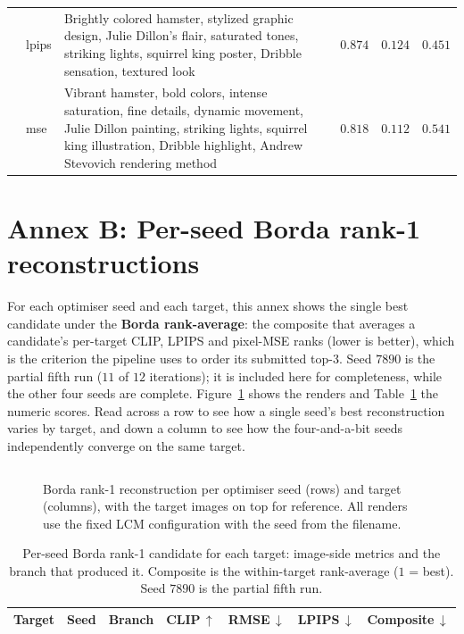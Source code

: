 \documentclass[runningheads]{llncs}
\begin{document}
\begin{table}[t]
\begin{tabular}{p{1.5cm} l p{5.6cm} c c c}
 & lpips & Brightly colored hamster, stylized graphic design, Julie Dillon's flair, saturated tones, striking lights, squirrel king poster, Dribble sensation, textured look & $0.874$ & $0.124$ & $0.451$ \\
 & mse & Vibrant hamster, bold colors, intense saturation, fine details, dynamic movement, Julie Dillon painting, striking lights, squirrel king illustration, Dribble highlight, Andrew Stevovich rendering method & $0.818$ & $0.112$ & $0.541$ \\
\bottomrule
\end{tabular}
\end{table}

\clearpage
\section*{Annex B: Per-seed Borda rank-1 reconstructions}
\label{annex:borda}
For each optimiser seed and each target, this annex shows the single best candidate under the \textbf{Borda rank-average}: the composite that averages a candidate's per-target CLIP, LPIPS and pixel-MSE ranks (lower is better), which is the criterion the pipeline uses to order its submitted top-3. Seed $7890$ is the partial fifth run ($11$ of $12$ iterations); it is included here for completeness, while the other four seeds are complete. Figure~\ref{fig:bordagrid} shows the renders and Table~\ref{tab:bordatop1} the numeric scores. Read across a row to see how a single seed's best reconstruction varies by target, and down a column to see how the four-and-a-bit seeds independently converge on the same target.

\begin{figure}[H]
\centering
\setlength{\tabcolsep}{1.2pt}
\renewcommand{\arraystretch}{0.4}
\begin{tabular}{c@{\hskip 2pt}cccccc}

\end{tabular}
\caption{Borda rank-1 reconstruction per optimiser seed (rows) and target (columns), with the target images on top for reference. All renders use the fixed LCM configuration with the seed from the filename.}
\label{fig:bordagrid}
\end{figure}

\begin{table}[t]
\centering
\caption{Per-seed Borda rank-1 candidate for each target: image-side metrics and the branch that produced it. Composite is the within-target rank-average ($1$ = best). Seed $7890$ is the partial fifth run.}
\label{tab:bordatop1}
\scriptsize
\renewcommand{\arraystretch}{1.1}
\begin{tabular}{p{1.7cm} l l c c c c}
\toprule
\textbf{Target} & \textbf{Seed} & \textbf{Branch} & \textbf{CLIP\,$\uparrow$} & \textbf{RMSE\,$\downarrow$} & \textbf{LPIPS\,$\downarrow$} & \textbf{Composite\,$\downarrow$} \\
\midrule

\end{tabular}
\end{table}
\end{document}
